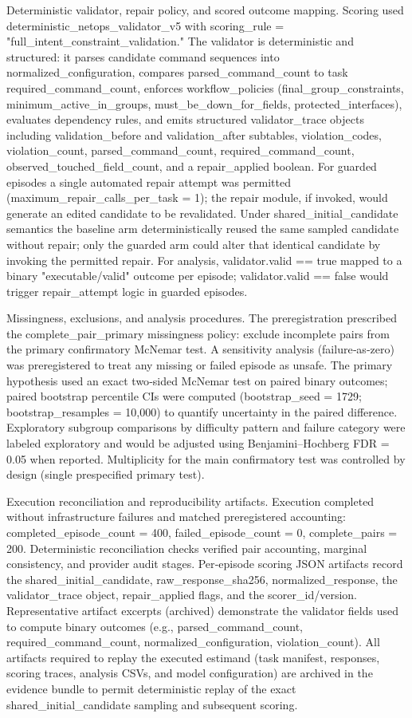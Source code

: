 \documentclass[conference]{IEEEtran}
\begin{document}
Deterministic validator, repair policy, and scored outcome mapping. Scoring used deterministic\_netops\_validator\_v5 with scoring\_rule = "full\_intent\_constraint\_validation." The validator is deterministic and structured: it parses candidate command sequences into normalized\_configuration, compares parsed\_command\_count to task required\_command\_count, enforces workflow\_policies (final\_group\_constraints, minimum\_active\_in\_groups, must\_be\_down\_for\_fields, protected\_interfaces), evaluates dependency rules, and emits structured validator\_trace objects including validation\_before and validation\_after subtables, violation\_codes, violation\_count, parsed\_command\_count, required\_command\_count, observed\_touched\_field\_count, and a repair\_applied boolean. For guarded episodes a single automated repair attempt was permitted (maximum\_repair\_calls\_per\_task = 1); the repair module, if invoked, would generate an edited candidate to be revalidated. Under shared\_initial\_candidate semantics the baseline arm deterministically reused the same sampled candidate without repair; only the guarded arm could alter that identical candidate by invoking the permitted repair. For analysis, validator.valid == true mapped to a binary "executable/valid" outcome per episode; validator.valid == false would trigger repair\_attempt logic in guarded episodes.

Missingness, exclusions, and analysis procedures. The preregistration prescribed the complete\_pair\_primary missingness policy: exclude incomplete pairs from the primary confirmatory McNemar test. A sensitivity analysis (failure‑as‑zero) was preregistered to treat any missing or failed episode as unsafe. The primary hypothesis used an exact two‑sided McNemar test on paired binary outcomes; paired bootstrap percentile CIs were computed (bootstrap\_seed = 1729; bootstrap\_resamples = 10,000) to quantify uncertainty in the paired difference. Exploratory subgroup comparisons by difficulty pattern and failure category were labeled exploratory and would be adjusted using Benjamini--Hochberg FDR = 0.05 when reported. Multiplicity for the main confirmatory test was controlled by design (single prespecified primary test).

Execution reconciliation and reproducibility artifacts. Execution completed without infrastructure failures and matched preregistered accounting: completed\_episode\_count = 400, failed\_episode\_count = 0, complete\_pairs = 200. Deterministic reconciliation checks verified pair accounting, marginal consistency, and provider audit stages. Per‑episode scoring JSON artifacts record the shared\_initial\_candidate, raw\_response\_sha256, normalized\_response, the validator\_trace object, repair\_applied flags, and the scorer\_id/version. Representative artifact excerpts (archived) demonstrate the validator fields used to compute binary outcomes (e.g., parsed\_command\_count, required\_command\_count, normalized\_configuration, violation\_count). All artifacts required to replay the executed estimand (task manifest, responses, scoring traces, analysis CSVs, and model configuration) are archived in the evidence bundle to permit deterministic replay of the exact shared\_initial\_candidate sampling and subsequent scoring.
\end{document}
